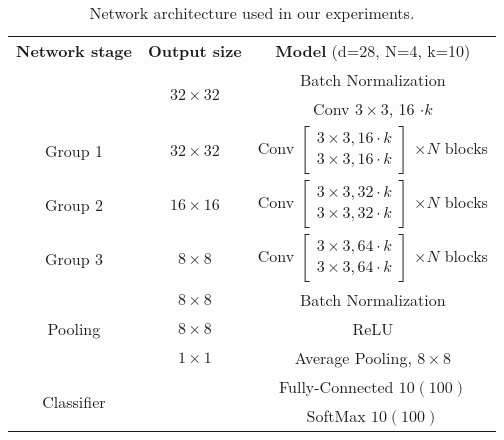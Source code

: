 \documentclass[10pt,twocolumn,letterpaper]{article}
\renewcommand\arraystretch{1.2}
\begin{document}
\begin{table*}[ht]

\centering
\setlength{\tabcolsep}{.3em}
\renewcommand\arraystretch{1.3}
\begin{tabular}{c|c|c}


\textbf{Network stage} & \textbf{Output size} & \textbf{Model} (d=28, N=4, k=10) \\

\Xhline{3\arrayrulewidth}
\multirow{2}{*}{Initial convolution} & \multirow{2}{*}{$32\times32$} & Batch Normalization \\
 &  & Conv $3\times3$, 16 $\cdot k$ \\

\hline
\multirow{2}{*}{Group 1} & \multirow{2}{*}{$32\times32$} & \multirow{2}{*}{Conv $\begin{bmatrix}3\times3, 16 \cdot k \\ 3\times3, 16 \cdot k \end{bmatrix}$ $\times N$ blocks} \\
  &  &  \\

\hline
\multirow{2}{*}{Group 2} & \multirow{2}{*}{$16\times16$} & \multirow{2}{*}{Conv $\begin{bmatrix}3\times3, 32 \cdot k \\ 3\times3, 32 \cdot k \end{bmatrix}$ $\times N$ blocks} \\
  &  &  \\

\hline
\multirow{2}{*}{Group 3} & \multirow{2}{*}{$8\times8$} & \multirow{2}{*}{Conv $\begin{bmatrix}3\times3, 64 \cdot k \\ 3\times3, 64 \cdot k \end{bmatrix}$ $\times N$ blocks} \\
  &  &  \\

\hline

\multirow{3}{*}{Pooling} & $8\times8$ & Batch Normalization \\
 & $8\times8$ & ReLU  \\
 & $1\times1$ & Average Pooling, $8\times8$ \\
\hline
\multirow{2}{*}{Classifier} & & Fully-Connected $10 (100)$  \\
 & & SoftMax $10 (100)$ \\

\hline
\end{tabular}
\caption{ Network architecture used in our experiments.}
\label{table:Volterra-architectures}
\end{table*}
\end{document}
